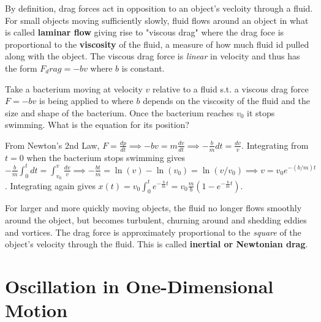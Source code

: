 \begin{definition}
    By definition, drag forces act in opposition to an object's vecloity through a fluid. For small objects moving sufficiently slowly, fluid flows around an object in what is called \textbf{laminar flow} giving rise to "viscous drag" where the drag foce is proportional to the \textbf{viscosity} of the fluid, a measure of how much fluid id pulled along with the object. The viscous drag force is \emph{linear} in velocity and thus has the form $F_drag = -bv$ where $b$ is constant.
\end{definition}
\begin{example}
    Take a bacterium moving at velocity $v$ relative to a fluid s.t. a viscous drag force $F = -bv$ is being applied to where $b$ depends on the viscosity of the fluid and the size and shape of the bacterium. Once the bacterium reaches $v_0$ it stops swimming. What is the equation for its position?
\end{example}
\begin{explanation}
    From Newton's 2nd Law, $F=\frac{dp}{dt} \implies -bv = m \frac{dv}{dt} \implies -\frac{b}{m}dt = \frac{dv}{v}$. Integrating from $t=0$ when the bacterium stops swimming gives $-\frac{b}{m}\int_0^t dt = \int_{v_0}^v \frac{dv}{v} \implies -\frac{bt}{m} = \ln(v) - \ln(v_0) = \ln(v/v_0) \implies v = v_0e^{-(b/m)t}$. Integrating again gives $x(t) = v_0 \int_0^t e^{-\frac{b}{m}t} = v_0 \frac{m}{b} (1-e^{-\frac{b}{m}t})$.
\end{explanation}
\begin{definition}
    For larger and more quickly moving objects, the fluid no longer flows smoothly around the object, but becomes turbulent, churning around and shedding eddies and vortices. The drag force is approximately proportional to the \emph{square} of the object's velocity through the fluid. This is called \textbf{inertial or Newtonian drag}.
\end{definition}

\section{Oscillation in One-Dimensional Motion}

